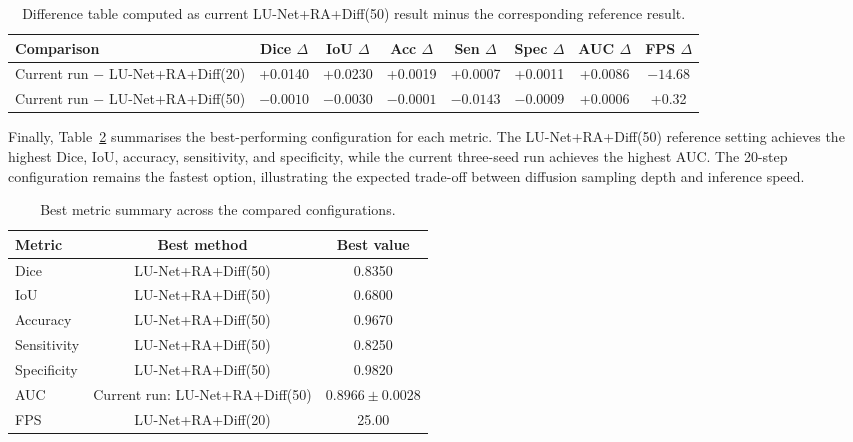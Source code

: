 \documentclass[journal,article,submit,pdftex,moreauthors]{Definitions/mdpi}
\begin{document}
\begin{table}[H]
\centering
\caption{Difference table computed as current LU-Net+RA+Diff(50) result minus the corresponding reference result.}
\label{tab:difference_current_reference}
\small
\begin{adjustbox}{width=\textwidth}
\begin{tabular}{lccccccc}
\toprule
Comparison & Dice $\Delta$ & IoU $\Delta$ & Acc $\Delta$ & Sen $\Delta$ & Spec $\Delta$ & AUC $\Delta$ & FPS $\Delta$ \\
\midrule
Current run $-$ LU-Net+RA+Diff(20) 
& +0.0140 & +0.0230 & +0.0019 & +0.0007 & +0.0011 & +0.0086 & $-14.68$ \\

Current run $-$ LU-Net+RA+Diff(50) 
& $-0.0010$ & $-0.0030$ & $-0.0001$ & $-0.0143$ & $-0.0009$ & +0.0006 & +0.32 \\
\bottomrule
\end{tabular}
\end{adjustbox}
\end{table}

Finally, Table~\ref{tab:best_metric_summary} summarises the best-performing configuration for each metric. The LU-Net+RA+Diff(50) reference setting achieves the highest Dice, IoU, accuracy, sensitivity, and specificity, while the current three-seed run achieves the highest AUC. The 20-step configuration remains the fastest option, illustrating the expected trade-off between diffusion sampling depth and inference speed.

\begin{table}[H]
\centering
\caption{Best metric summary across the compared configurations.}
\label{tab:best_metric_summary}
\small
\begin{tabular}{lcc}
\toprule
Metric & Best method & Best value \\
\midrule
Dice & LU-Net+RA+Diff(50) & 0.8350 \\
IoU & LU-Net+RA+Diff(50) & 0.6800 \\
Accuracy & LU-Net+RA+Diff(50) & 0.9670 \\
Sensitivity & LU-Net+RA+Diff(50) & 0.8250 \\
Specificity & LU-Net+RA+Diff(50) & 0.9820 \\
AUC & Current run: LU-Net+RA+Diff(50) & $0.8966 \pm 0.0028$ \\
FPS & LU-Net+RA+Diff(20) & 25.00 \\
\bottomrule
\end{tabular}
\end{table}
\end{document}

